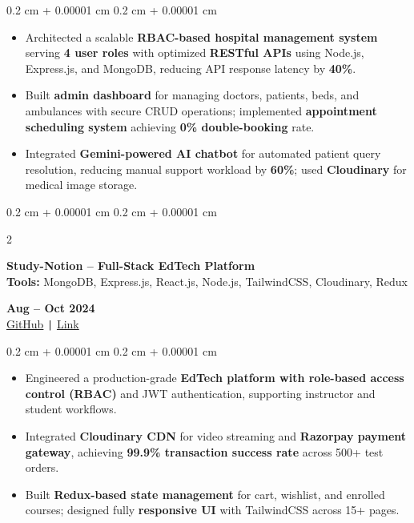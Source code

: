 \documentclass[10pt, letterpaper]{article}
\newenvironment{highlights}{
    \begin{itemize}[
        topsep=0.05 cm,
        parsep=0.05 cm,
        partopsep=0pt,
        itemsep=0pt,
        leftmargin=0.4 cm + 10pt
    ]
}{
    \end{itemize}
} %
\newenvironment{onecolentry}{
    \begin{adjustwidth}{
        0.2 cm + 0.00001 cm
    }{
        0.2 cm + 0.00001 cm
    }
}{
    \end{adjustwidth}
} %
\newenvironment{twocolentry}[2][]{
    \onecolentry
    \def\secondColumn{#2}
    \setcolumnwidth{\fill, 4.5 cm}
    \begin{paracol}{2}
}{
    \switchcolumn \raggedleft \secondColumn
    \end{paracol}
    \endonecolentry
} %
\let\hrefWithoutArrow\href
\renewcommand{\href}[2]{\hrefWithoutArrow{#1}{\ifthenelse{\equal{#2}{}}{ }{#2 }\raisebox{.15ex}{\footnotesize \faExternalLink*}}}
\begin{document}
\begin{onecolentry}
\begin{highlights}
\item Architected a scalable \textbf{RBAC-based hospital management system} serving \textbf{4 user roles} with optimized \textbf{RESTful APIs} using Node.js, Express.js, and MongoDB, reducing API response latency by \textbf{40\%}.
\item Built \textbf{admin dashboard} for managing doctors, patients, beds, and ambulances with secure CRUD operations; implemented \textbf{appointment scheduling system} achieving \textbf{0\% double-booking} rate.
\item Integrated \textbf{Gemini-powered AI chatbot} for automated patient query resolution, reducing manual support workload by \textbf{60\%}; used \textbf{Cloudinary} for medical image storage.
\end{highlights}
\end{onecolentry}

\vspace{0.05 cm}

\begin{twocolentry}{
    \textbf{Aug -- Oct 2024} \\
\hrefWithoutArrow{https://github.com/Gagan202005/StudyNotion1}{GitHub} \texttt{|}
\hrefWithoutArrow{https://study-notion-frontend-brown.vercel.app/}{Link}
}
\textbf{Study-Notion -- Full-Stack EdTech Platform} \\
\textbf{Tools:} MongoDB, Express.js, React.js, Node.js, TailwindCSS, Cloudinary, Redux
\end{twocolentry}

\begin{onecolentry}
\begin{highlights}
\item Engineered a production-grade \textbf{EdTech platform with role-based access control (RBAC)} and JWT authentication, supporting instructor and student workflows.
\item Integrated \textbf{Cloudinary CDN} for video streaming and \textbf{Razorpay payment gateway}, achieving \textbf{99.9\% transaction success rate} across 500+ test orders.
\item Built \textbf{Redux-based state management} for cart, wishlist, and enrolled courses; designed fully \textbf{responsive UI} with TailwindCSS across 15+ pages.
\end{highlights}
\end{onecolentry}
\end{document}
